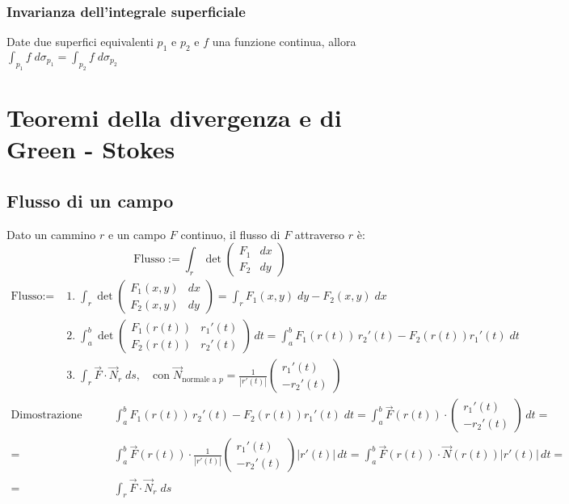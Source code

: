 \documentclass[a4paper]{article}
\begin{document}
\subsubsection*{Invarianza dell'integrale superficiale}
Date due superfici equivalenti \(p_1\) e \(p_2\) e \(f\) una funzione continua, allora \(\displaystyle \int_{p_1} f \; d\sigma_{p_1} = \int_{p_2} f \; d\sigma_{p_2}\)

\newpage


\section{Teoremi della divergenza e di Green - Stokes}
\subsection{Flusso di un campo}
Dato un cammino \(r\) e un campo \(F\) continuo, il flusso di \(F\) attraverso \(r\) è:
\[\text{Flusso} := \int_r \det \left(\begin{matrix} F_1 & dx \\ F_2 & dy \end{matrix}\right)\]
\begin{align*}
	\text{Flusso} := \; &1. \; \int_r \det \left(\begin{matrix} F_1(x,y) & dx \\[3pt] F_2(x,y) & dy \end{matrix}\right) = \int_r F_1(x,y) \; dy - F_2(x,y) \; dx \\
	&2. \; \int_a^b \det \left(\begin{matrix} F_1(r(t)) & r_1'(t) \\[3pt] F_2(r(t)) & r_2'(t) \end{matrix}\right) \, dt = \int_a^b F_1(r(t)) \, r_2'(t) - F_2(r(t)) r_1'(t) \; dt \\
	&3. \; \int_r \vec{F} \cdot \vec{N}_r \; ds, \quad \text{con} \; \vec{N}_\text{normale a \(p\)} = \frac{1}{\left|r'(t)\right|} \left(\begin{matrix} r_1'(t) \\ -r_2'(t) \end{matrix}\right)
\end{align*}
\begin{align*}
	\text{Dimostrazione punto 3:} \qquad &\int_a^b F_1(r(t)) \, r_2'(t) - F_2(r(t)) r_1'(t) \; dt = \int_a^b \vec{F}(r(t)) \cdot \left(\begin{matrix} r_1'(t) \\ -r_2'(t) \end{matrix}\right) \, dt = \\
	= &\int_a^b \vec{F}(r(t)) \cdot \frac{1}{\left|r'(t)\right|} \left(\begin{matrix} r_1'(t) \\ -r_2'(t) \end{matrix}\right) \left|r'(t)\right| \, dt = \int_a^b \vec{F}(r(t)) \cdot \vec{N}(r(t)) \left|r'(t)\right| \, dt = \\
	= &\int_r \vec{F} \cdot \vec{N}_r \; ds
\end{align*}
\end{document}
